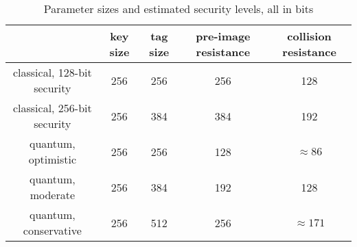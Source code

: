 \documentclass{article}
\begin{document}
\begin{table}
    \begin{center}
        \begin{tabular}{c|c|c|c|c}
            & key size & tag size & pre-image resistance & collision resistance \\
            \hline
            classical, 128-bit security & 256 & 256 & 256 & 128 \\
            classical, 256-bit security & 256 & 384 & 384 & 192 \\
            quantum, optimistic & 256 & 256 & 128 & $\approx 86$\\
            quantum, moderate & 256 & 384 & 192 & 128\\
            quantum, conservative & 256 & 512 & 256 & $\approx 171$\\
        \end{tabular}
    \end{center}
    \caption{Parameter sizes and estimated security levels, all in bits}
\end{table}



\end{document}
